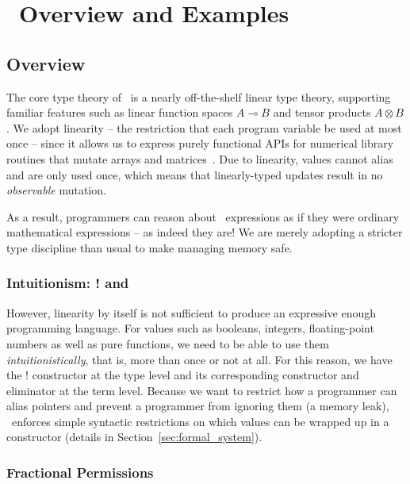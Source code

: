 \section{\lang\ Overview and Examples}\label{sec:lang_and_examples}

\subsection{Overview}

The core type theory of \lang\ is a nearly off-the-shelf linear type
theory, supporting familiar features such as linear function spaces
$A \multimap B$ and tensor products $A \otimes B$. We adopt linearity
-- the restriction that each program variable be used at most once --
since it allows us to express purely functional APIs for numerical
library routines that mutate arrays and matrices~\cite{Wadler90}. Due
to linearity, values cannot alias and are only used once, which means
that linearly-typed updates result in no \emph{observable} mutation.

As a result, programmers can reason about \lang\ expressions as if they
were ordinary mathematical expressions -- as indeed they are! We are
merely adopting a stricter type discipline than usual to make managing
memory safe. 

\subsubsection{Intuitionism: ! and }

However, linearity by itself is not sufficient to produce an expressive enough
programming language. For values such as booleans, integers, floating-point
numbers as well as pure functions, we need to be able to use them
\emph{intuitionistically}, that is, more than once or not at all. For this
reason, we have the ! constructor at the type level and its corresponding
 constructor and  eliminator at
the term level. Because we want to restrict how a programmer can alias pointers
and prevent a programmer from ignoring them (a memory leak), \lang\ enforces
simple syntactic restrictions on which values can be wrapped up in a
 constructor (details in Section~\ref{sec:formal_system}).

\subsubsection{Fractional Permissions}

